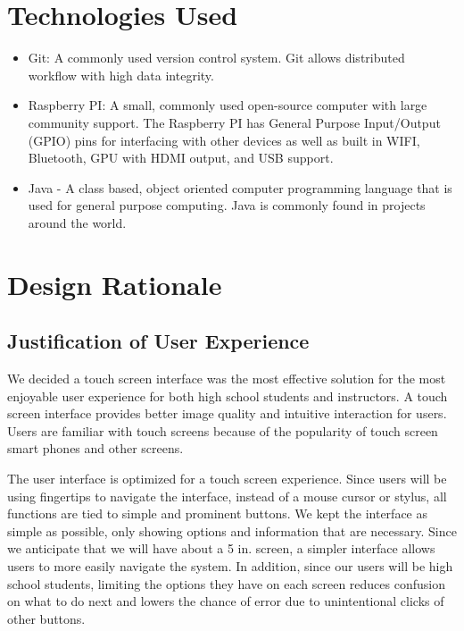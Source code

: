 \section{Technologies Used}
	\begin{itemize}
	\item Git: A commonly used version control system. Git allows distributed workflow with high data integrity.
	\item Raspberry PI: A small, commonly used open-source computer with large community support. The Raspberry PI has General Purpose Input/Output (GPIO) pins for interfacing with other devices as well as built in WIFI, Bluetooth, GPU with HDMI output, and USB support.
	\item Java - A class based, object oriented computer programming language that is used for general purpose computing. Java is commonly found in projects around the world.
	\end{itemize}


\section{Design Rationale}
\subsection{Justification of User Experience}

We decided a touch screen interface was the most effective solution for the most enjoyable user experience for both high school students and instructors. A touch screen interface provides better image quality and intuitive interaction for users. Users are familiar with touch screens because of the popularity of touch screen smart phones and other screens.

The user interface is optimized for a touch screen experience. Since users will be using fingertips to navigate the interface, instead of a mouse cursor or stylus, all functions are tied to simple and prominent buttons. We kept the interface as simple as possible, only showing options and information that are necessary. Since we anticipate that we will have about a 5 in. screen, a simpler interface allows users to more easily navigate the system. In addition, since our users will be high school students, limiting the options they have on each screen reduces confusion on what to do next and lowers the chance of error due to unintentional clicks of other buttons.


